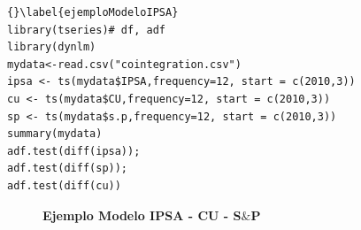 %		
\begin{lstlisting}[title={‘Código R: Ejemplo Modelo IPSA - CU - S$\&$P},basicstyle=\ttfamily]{}\label{ejemploModeloIPSA}
library(tseries)# df, adf
library(dynlm)	
mydata<-read.csv("cointegration.csv")
ipsa <- ts(mydata$IPSA,frequency=12, start = c(2010,3))
cu <- ts(mydata$CU,frequency=12, start = c(2010,3))
sp <- ts(mydata$s.p,frequency=12, start = c(2010,3))
summary(mydata)
adf.test(diff(ipsa));
adf.test(diff(sp)); 
adf.test(diff(cu))
\end{lstlisting}
%	
	\begin{figure}[H]
		\centering
		\textbf{\textbf{Ejemplo Modelo IPSA - CU - S$\&$P}}\par\medskip
	\end{figure}
%	

